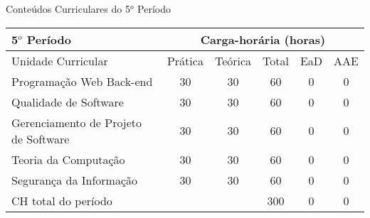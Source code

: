 \begin{quadro}[ht!]
\centering
\caption{Conteúdos Curriculares do 5$^o$ Período}\label{qua:periodo5}
\begin{tabular}{|p{5.0cm}|c|c|c|c|c|}
\hline
\rowcolor{blue1} 5$^o$ Período & \multicolumn{5}{|c|}{\centering Carga-horária (horas)} \\ \hline
\rowcolor{blue1} Unidade Curricular & Prática & Teórica & Total & EaD & AAE \\ \hline
Programação Web Back-end & 30 & 30 & 60 & 0	&	0 \\	\hline
Qualidade de Software & 30 & 30 & 60 & 0	&	0 \\	\hline
Gerenciamento de Projeto de Software & 30 & 30 & 60 & 0	&	0 \\	\hline
Teoria da Computação & 30 & 30 & 60 & 0	&	0 \\	\hline
Segurança da Informação & 30 & 30 & 60 & 0	&	0 \\	\hline
CH total do período & \multicolumn{2}{p{3.3cm}|}{\cellcolor{blue1}} & 300 & 0	&	0 \\ \hline
\end{tabular} \end{quadro}